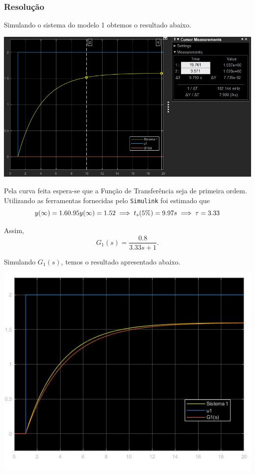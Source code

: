 \documentclass[
]{book}
\begin{document}
\hypertarget{resoluuxe7uxe3o}{%
\subsubsection*{Resolução}\label{resoluuxe7uxe3o}}

Simulando o sistema do modelo 1 obtemos o resultado abaixo.

\includegraphics{Imagens/Lab3/Resolução/prob1A.jpg}

Pela curva feita espera-se que a Função de Transferência seja de primeira ordem. Utilizando as ferramentas fornecidas pelo \texttt{Simulink} foi estimado que
\[
y(\infty) = 1.6 \\
0.95y(\infty) = 1.52 \implies  t_s(5\%) = 9.97s \implies \tau = 3.33
\]

Assim,
\[
G_1(s) = \frac {0.8}{3.33s+1}.
\]

Simulando \(G_1(s)\), temos o resultado apresentado abaixo.

\includegraphics{Imagens/Lab3/Resolução/prob1B.jpg}
\end{document}
